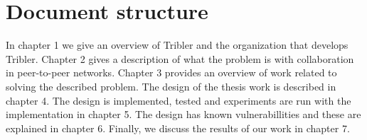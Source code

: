 \section{Document structure}
In chapter 1 we give an overview of Tribler and the organization that develops Tribler.
Chapter 2 gives a description of what the problem is with collaboration in peer-to-peer networks.
Chapter 3 provides an overview of work related to solving the described problem.
The design of the thesis work is described in chapter 4.
The design is implemented, tested and experiments are run with the implementation in chapter 5.
The design has known vulnerabillities and these are explained in chapter 6.
Finally, we discuss the results of our work in chapter 7.
